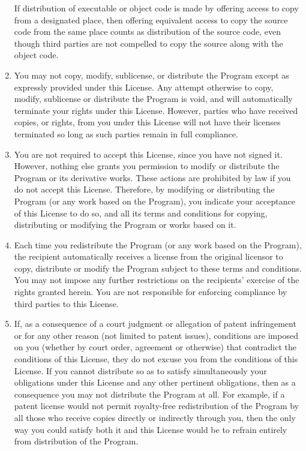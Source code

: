 \documentclass[11pt, letterpaper]{book}
\begin{document}
\begin{enumerate}
If distribution of executable or object code is made by offering
access to copy from a designated place, then offering equivalent
access to copy the source code from the same place counts as
distribution of the source code, even though third parties are not
compelled to copy the source along with the object code.

\item
You may not copy, modify, sublicense, or distribute the Program
except as expressly provided under this License.  Any attempt
otherwise to copy, modify, sublicense or distribute the Program is
void, and will automatically terminate your rights under this License.
However, parties who have received copies, or rights, from you under
this License will not have their licenses terminated so long as such
parties remain in full compliance.

\item
You are not required to accept this License, since you have not
signed it.  However, nothing else grants you permission to modify or
distribute the Program or its derivative works.  These actions are
prohibited by law if you do not accept this License.  Therefore, by
modifying or distributing the Program (or any work based on the
Program), you indicate your acceptance of this License to do so, and
all its terms and conditions for copying, distributing or modifying
the Program or works based on it.

\item
Each time you redistribute the Program (or any work based on the
Program), the recipient automatically receives a license from the
original licensor to copy, distribute or modify the Program subject to
these terms and conditions.  You may not impose any further
restrictions on the recipients' exercise of the rights granted herein.
You are not responsible for enforcing compliance by third parties to
this License.

\item
If, as a consequence of a court judgment or allegation of patent
infringement or for any other reason (not limited to patent issues),
conditions are imposed on you (whether by court order, agreement or
otherwise) that contradict the conditions of this License, they do not
excuse you from the conditions of this License.  If you cannot
distribute so as to satisfy simultaneously your obligations under this
License and any other pertinent obligations, then as a consequence you
may not distribute the Program at all.  For example, if a patent
license would not permit royalty-free redistribution of the Program by
all those who receive copies directly or indirectly through you, then
the only way you could satisfy both it and this License would be to
refrain entirely from distribution of the Program.


\end{enumerate}
\end{document}
